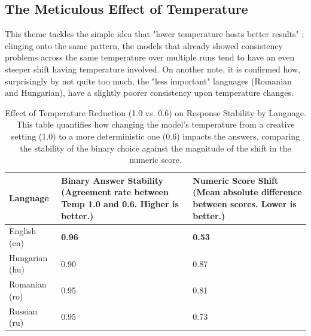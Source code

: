 \documentclass[11pt]{article}
\begin{document}
\subsection{The Meticulous Effect of Temperature} %
This theme tackles the simple idea that "lower temperature hosts better results" \cite{li2025}; clinging onto the same pattern, the models that already showed consistency problems across the same temperature over multiple runs tend to have an even steeper shift having temperature involved. On another note, it is confirmed how, surprisingly by not quite too much, the "less important" languages (Romanian and Hungarian), have a slightly poorer consistency upon temperature changes.
\begin{table}[htbp]
\centering
\caption{Effect of Temperature Reduction (1.0 vs. 0.6) on Response Stability by Language. This table quantifies how changing the model's temperature from a creative setting (1.0) to a more deterministic one (0.6) impacts the answers, comparing the stability of the binary choice against the magnitude of the shift in the numeric score.}
\label{tab:temp_effect_lang}
\renewcommand{\arraystretch}{1.2}
\begin{tabular}{l C{5.5cm} C{5.5cm}}
\toprule
\textbf{Language} & 
\textbf{Binary Answer Stability} \newline \small (Agreement rate between Temp 1.0 and 0.6. Higher is better.) & 
\textbf{Numeric Score Shift} \newline \small (Mean absolute difference between scores. Lower is better.) \\
\midrule
English (en)    & \textbf{0.96} & \textbf{0.53} \\
Hungarian (hu)  & 0.90 & 0.87 \\
Romanian (ro)   & 0.95 & 0.81 \\
Russian (ru)    & 0.95 & 0.73 \\
\bottomrule
\end{tabular}
\end{table}



\end{document}
